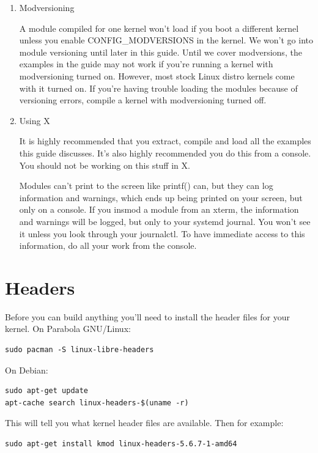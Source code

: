 \documentclass[11pt]{article}
\begin{document}
\begin{enumerate}
\item Modversioning
\label{sec:orgbc94263}

A module compiled for one kernel won't load if you boot a different kernel unless you enable CONFIG\_MODVERSIONS in the kernel. We won't go into module versioning until later in this guide. Until we cover modversions, the examples in the guide may not work if you're running a kernel with modversioning turned on. However, most stock Linux distro kernels come with it turned on. If you're having trouble loading the modules because of versioning errors, compile a kernel with modversioning turned off.

\item Using X
\label{sec:org26b16fb}

It is highly recommended that you extract, compile and load all the examples this guide discusses. It's also highly recommended you do this from a console. You should not be working on this stuff in X.

Modules can't print to the screen like printf() can, but they can log information and warnings, which ends up being printed on your screen, but only on a console. If you insmod a module from an xterm, the information and warnings will be logged, but only to your systemd journal. You won't see it unless you look through your journalctl. To have immediate access to this information, do all your work from the console.
\end{enumerate}

\section{Headers}
\label{sec:org087541e}
Before you can build anything you'll need to install the header files for your kernel. On Parabola GNU/Linux:

\begin{verbatim}
sudo pacman -S linux-libre-headers
\end{verbatim}

On Debian:

\begin{verbatim}
sudo apt-get update
apt-cache search linux-headers-$(uname -r)
\end{verbatim}

This will tell you what kernel header files are available. Then for example:

\begin{verbatim}
sudo apt-get install kmod linux-headers-5.6.7-1-amd64
\end{verbatim}
\end{document}
